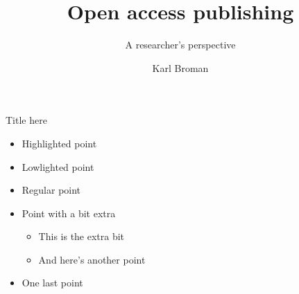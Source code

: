 \documentclass[12pt]{beamer}
\title{Open access publishing}
\subtitle{\textcolor{subtitle}{A researcher's perspective}}
\author{Karl Broman}
\institute{\textcolor{gray}{Biostatistics \& Medical Informatics \\[2pt] University of Wisconsin{\textendash}Madison}}
\date{}
\begin{document}
{
\frame{\titlepage}
}



\begin{frame}{Title here}
\begin{itemize}
\item {\color{hilight} Highlighted point}
\item {\color{lolight} Lowlighted point}
\item Regular point
\item Point with a bit extra

\begin{itemize}
\item This is the extra bit
\item And here's another point
\end{itemize}

\item One last point
\end{itemize}
\end{frame}
\end{document}
